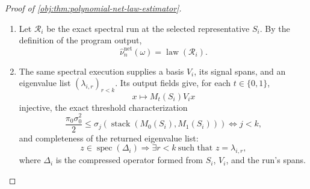 \documentclass[11pt]{article}
\begin{document}
\begin{proof}[Proof of \cref{obj:thm:polynomial-net-law-estimator}]
\begin{enumerate}
\item Let \(\mathcal R_i\) be the exact spectral run at the selected
representative \(S_i\).  By the definition of the program output,
\begin{equation}
\widehat\nu_n^{\mathrm{net}}(\omega)=\operatorname{law}(\mathcal R_i).
\label{eq:finite-net-selected-run-law}
\end{equation} %

\item The same spectral execution supplies a basis \(V_i\), its signal spans,
and an eigenvalue list \((\lambda_{i,r})_{r<k}\).  Its output fields give, for
each \(t\in\{0,1\}\),
\[
x\longmapsto M_t(S_i)V_i x
\]
injective, the exact threshold characterization
\[
\frac{\pi_0\sigma_0^2}{2}
\le
\sigma_j\!\left(\operatorname{stack}(M_0(S_i),M_1(S_i))\right)
\Longleftrightarrow j<k,
\]
and completeness of the returned eigenvalue list:
\[
z\in\operatorname{spec}(\Delta_i)
\Longrightarrow
\exists r<k\ \text{such that }z=\lambda_{i,r},
\]
where \(\Delta_i\) is the compressed operator formed from \(S_i\), \(V_i\), and
the run's spans. %


\end{enumerate}
\end{proof}
\end{document}
